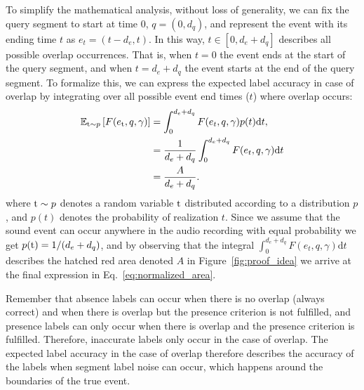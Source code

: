 
To simplify the mathematical analysis, without loss of generality, we can fix the query segment to start at time $0$, $q=(0, d_q)$, and represent the event with its ending time $t$ as $e_t = (t-d_e, t)$. In this way, $t\in[0, d_e+d_q]$ describes all possible overlap occurrences. That is, when $t=0$ the event ends at the start of the query segment, and when $t=d_e+d_q$ the event starts at the end of the query segment. To formalize this, we can express the expected label accuracy in case of overlap by integrating over all possible event end times ($t$) where overlap occurs: %
\begin{align}
\label{eq:_integral_1}
    \mathbb{E}_{{\textnormal{t}} \sim p}\left[F(e_{{\textnormal{t}}}, q, \gamma)\right] &= \int_{0}^{d_e + d_q}F(e_t, q, \gamma)p(t)\mathrm{d}t, \\
    \label{eq:_integral_2}
    &= \frac{1}{d_e + d_q} \int_{0}^{d_e + d_q}F(e_t, q, \gamma)\mathrm{d}t \\
    \label{eq:normalized_area}
    &= \frac{A}{d_e + d_q}.
\end{align}
where ${\textnormal{t}} \sim p$ denotes a random variable ${\textnormal{t}}$ distributed according to a distribution $p$, and $p(t)$ denotes the probability of realization $t$. Since we assume that the sound event can occur anywhere in the audio recording with equal probability we get $p({\textnormal{t}}) = 1/(d_e + d_q)$, and by observing that the integral $\int_{0}^{d_e+d_q}F(e_t, q, \gamma)\mathrm{d}t$ describes the hatched red area denoted $A$ in Figure~\ref{fig:proof_idea} we arrive at the final expression in Eq.~\ref{eq:normalized_area}. 

Remember that absence labels can occur when there is no overlap (always correct) and when there is overlap but the presence criterion is not fulfilled, and presence labels can only occur when there is overlap and the presence criterion is fulfilled. Therefore, inaccurate labels only occur in the case of overlap. The expected label accuracy in the case of overlap therefore describes the accuracy of the labels when segment label noise can occur, which happens around the boundaries of the true event.

